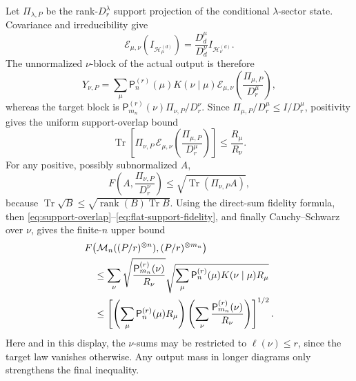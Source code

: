 \documentclass[11pt]{article}
\theoremstyle{remark}
\theoremstyle{plain}
\newcommand{\cE}{\mathcal E}
\newcommand{\cH}{\mathcal H}
\newcommand{\cM}{\mathcal M}
\newcommand{\Tr}{\operatorname{Tr}}
\newcommand{\ot}{\otimes}
\begin{document}
Let \(\Pi_{\lambda,P}\) be the rank-\(D_r^\lambda\) support projection of
the conditional \(\lambda\)-sector state.  Covariance and irreducibility
give
\[
  \cE_{\mu,\nu}(I_{\cH_\mu^{(d)}})
  =\frac{D_d^\mu}{D_d^\nu}I_{\cH_\nu^{(d)}}.
\]
The unnormalized \(\nu\)-block of the actual output is therefore
\[
  Y_{\nu,P}
  =\sum_\mu\mathsf P_n^{(r)}(\mu)K(\nu\mid\mu)
   \cE_{\mu,\nu}\!\left(\frac{\Pi_{\mu,P}}{D_r^\mu}\right),
\]
whereas the target block is
\(\mathsf P_{m_n}^{(r)}(\nu)\Pi_{\nu,P}/D_r^\nu\).
Since
\(\Pi_{\mu,P}/D_r^\mu\le I/D_r^\mu\), positivity gives the uniform
support-overlap bound
\begin{equation}
  \Tr\!\left[
    \Pi_{\nu,P}\,
    \cE_{\mu,\nu}\!\left(\frac{\Pi_{\mu,P}}{D_r^\mu}\right)
  \right]
  \le\frac{R_\mu}{R_\nu}.
  \label{eq:support-overlap}
\end{equation}
For any positive, possibly subnormalized \(A\),
\begin{equation}
  F\!\left(A,\frac{\Pi_{\nu,P}}{D_r^\nu}\right)
  \le\sqrt{\Tr(\Pi_{\nu,P}A)},
  \label{eq:flat-support-fidelity}
\end{equation}
because \(\Tr\sqrt B\le\sqrt{\operatorname{rank}(B)\Tr B}\).
Using the direct-sum fidelity formula, then
\eqref{eq:support-overlap}--\eqref{eq:flat-support-fidelity}, and finally
Cauchy--Schwarz over \(\nu\), gives the finite-\(n\) upper bound
\begin{align}
 &F\!\left(
   \cM_n((P/r)^{\ot n}),
   (P/r)^{\ot m_n}
 \right)\notag\\
 &\quad\le
 \sum_\nu
 \sqrt{\frac{\mathsf P_{m_n}^{(r)}(\nu)}{R_\nu}}
 \sqrt{\sum_\mu
       \mathsf P_n^{(r)}(\mu)K(\nu\mid\mu)R_\mu}
 \notag\\
 &\quad\le
 \left[
   \left(\sum_\mu\mathsf P_n^{(r)}(\mu)R_\mu\right)
   \left(\sum_\nu\frac{\mathsf P_{m_n}^{(r)}(\nu)}{R_\nu}\right)
 \right]^{1/2}.
 \label{eq:grassmann-finite-converse}
\end{align}
Here and in this display, the \(\nu\)-sums may be restricted to
\(\ell(\nu)\le r\), since the target law vanishes otherwise.  Any output
mass in longer diagrams only strengthens the final inequality.
\end{document}
